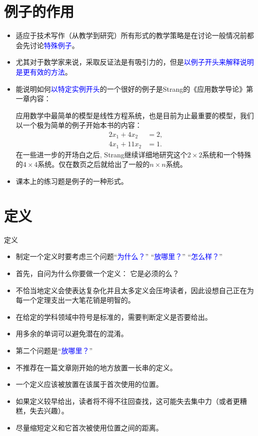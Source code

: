 \documentclass[fontset=mac]{ctexbeamer}
\newcommand{\blue}[1]{\textcolor{blue}{#1}}
\begin{document}
\section{例子的作用}

\begin{frame}
\begin{itemize}
	\item 
适应于技术写作（从教学到研究）所有形式的教学策略是在讨论一般情况前都会先讨论\blue{特殊例子}。
\item 
尤其对于数学家来说，采取反证法是有吸引力的，但是\blue{以例子开头来解释说明是更有效的方法}。
\item 
能说明如何\blue{以特定实例开头}的一个很好的例子是Strang的《应用数学导论》第一章内容：

{\small
应用数学中最简单的模型是线性方程系统，也是目前为止最重要的模型，我们以一个极为简单的例子开始本书的内容：
\begin{align*}
	2x_1+4x_2& =2,\\
	4x_1+11x_2 & =1.
\end{align*}
在一些进一步的开场白之后, Strang继续详细地研究这个$2\times 2$系统和一个特殊的$4\times 4$系统。仅在数页之后就给出了一般的$n \times n$系统。}

\item 课本上的\alert{练习题}是例子的一种形式。
\end{itemize}


\end{frame}


\section{定义}
\begin{frame}{定义}
\begin{itemize}
\item 
制定一个定义时要考虑三个问题``\blue{为什么？}''  ``\blue{放哪里？}''   ``\blue{怎么样？}'' 
\item 
首先，自问为什么你要做一个定义： 它是必须的么？
\item 
不恰当地定义会使表达复杂化并且太多定义会压垮读者，因此设想自己正在为每一个定理支出一大笔花销是明智的。
\item 
在给定的学科领域中符号是标准的，需要判断定义是否要给出。
\item 
用多余的单词可以避免潜在的混淆。
\end{itemize}
\end{frame}


\begin{frame}
\begin{itemize}
	\item  第二个问题是``\blue{放哪里？}'' 
	\item 不推荐在一篇文章刚开始的地方放置一长串的定义。
	\item  一个定义应该被放置在该属于首次使用的位置。
	\item 如果定义较早给出，读者将不得不往回查找，这可能失去集中力（或者更糟糕，失去兴趣）。
	\item 尽量缩短定义和它首次被使用位置之间的距离。
\end{itemize}
\end{frame}
\end{document}
